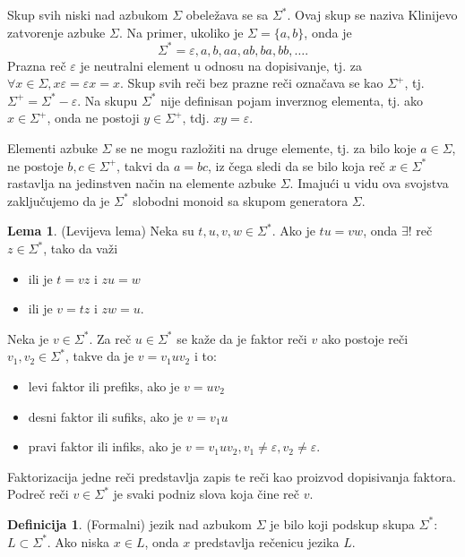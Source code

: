\documentclass[12pt,oneside]{memoir}
\theoremstyle{plain}
\theoremstyle{definition}
\newtheorem{defn}{Definicija} %
\newtheorem{lem}{Lema} %
\begin{document}
Skup svih niski nad azbukom $\Sigma$ obeležava se sa $\Sigma^*$. Ovaj skup se naziva Klinijevo zatvorenje azbuke $\Sigma$. Na primer, ukoliko je $\Sigma = \{a,b\}$, onda je $$\Sigma^* = { \varepsilon, a, b, aa, ab, ba, bb, …}.$$
Prazna reč $\varepsilon$ je neutralni element u odnosu na dopisivanje, tj. za $\forall x\in \Sigma, x\varepsilon = \varepsilon x = x$. Skup svih reči bez prazne reči označava se kao $\Sigma^+$, tj. $\Sigma^+ = \Sigma^* - { \varepsilon }$. Na skupu $\Sigma^*$ nije definisan pojam inverznog elementa, tj. ako $x \in \Sigma^+$, onda ne postoji $y \in \Sigma^+$, tdj. $xy = \varepsilon$.

Elementi azbuke $\Sigma$ se ne mogu razložiti na druge elemente, tj. za bilo koje $a \in \Sigma$, ne postoje $b,c  \in \Sigma^+$, takvi da $a = bc$, iz čega sledi da se bilo koja reč $x \in \Sigma^*$ rastavlja na jedinstven način na elemente azbuke $\Sigma$. Imajući u vidu ova svojstva zaključujemo da je $\Sigma^*$ slobodni monoid sa skupom generatora $\Sigma$.
\begin{lem}
(Levijeva lema) Neka su $t, u, v, w \in \Sigma^*$. Ako je $tu = vw$, onda $\exists !$ reč $z  \in \Sigma^*$, tako da važi
	\begin{itemize}
	\item ili je $t = vz$ i $zu = w$
	\item ili je $v = tz$ i $zw = u.$
	\end{itemize}
\end{lem}

Neka je $v \in \Sigma^*$. Za reč $u \in \Sigma^*$ se kaže da je faktor reči $v$ ako postoje reči $v_1, v_2 \in \Sigma^*$, takve da je $v = v_1uv_2$ i to:
\begin{itemize}
\item levi faktor ili prefiks, ako je $v=uv_2$
\item desni faktor ili sufiks, ako je $v = v_1u$
\item pravi faktor ili infiks, ako je $v = v_1uv_2, v_1 \neq \varepsilon, v_2 \neq \varepsilon.$
\end{itemize}
Faktorizacija jedne reči predstavlja zapis te reči kao proizvod dopisivanja faktora. Podreč reči $v \in \Sigma^*$ je svaki podniz slova koja čine reč $v$.

\begin{defn}
(Formalni) jezik nad azbukom $\Sigma$ je bilo koji podskup skupa $\Sigma^*$: $L \subset \Sigma^*$. Ako niska $x \in L$, onda $x$ predstavlja rečenicu jezika $L$.
\end{defn}
\end{document}
